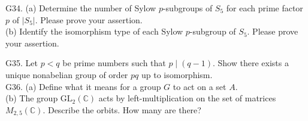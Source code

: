 G34. (a) Determine the number of Sylow $p$-subgroups of $S_{5}$ for each prime factor $p$ of $\left|S_{5}\right|$. Please prove your assertion.\\
(b) Identify the isomorphism type of each Sylow $p$-subgroup of $S_{5}$. Please prove your assertion.

G35. Let $p<q$ be prime numbers such that $p \mid(q-1)$. Show there exists a unique nonabelian group of order $p q$ up to isomorphism.\\
G36. (a) Define what it means for a group $G$ to act on a set $A$.\\
(b) The group $\mathrm{GL}_{2}(\mathbb{C})$ acts by left-multiplication on the set of matrices $M_{2,5}(\mathbb{C})$. Describe the orbits. How many are there?